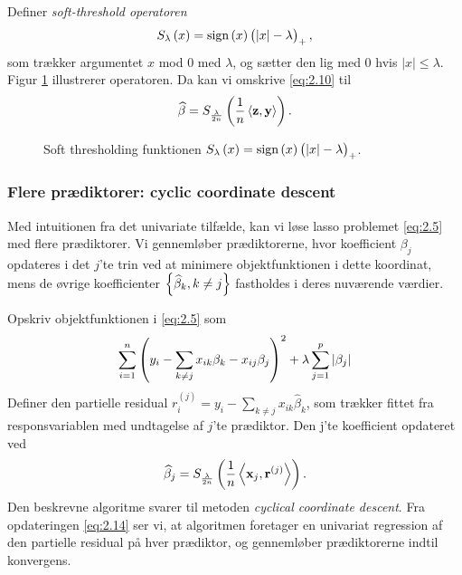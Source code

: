 Definer \textit{soft-threshold operatoren}
\begin{align*}
S_\lambda\del{x}=\text{sign}\del{x} \del{\vert x \vert - \lambda}_+,
\end{align*}
som trækker argumentet $x$ mod 0 med $\lambda$, og sætter den lig med 0 hvis $\vert x \vert \leq \lambda$. 
Figur \ref{fig:soft_thresholding_fct} illustrerer operatoren.
Da kan vi omskrive \eqref{eq:2.10} til
\begin{align*}
\widehat{\beta} = S_{\frac{\lambda}{2n}} \del{\frac{1}{n} \left\langle \mathbf{z}, \mathbf{y} \right\rangle}.
\end{align*}
%
\begin{figure}[H]
\centering
\scalebox{0.8}{}
\caption[optional short text]{Soft thresholding funktionen $S_\lambda\del{x}=\text{sign}\del{x} \del{\vert x \vert - \lambda}_+$.} \label{fig:soft_thresholding_fct}
\end{figure}
%
\subsubsection{Flere prædiktorer: cyclic coordinate descent}
Med intuitionen  fra det univariate tilfælde, kan vi løse lasso problemet \eqref{eq:2.5} med flere prædiktorer.
Vi gennemløber prædiktorerne, hvor koefficient \(\beta_j\) opdateres i det \(j\)'te trin ved at minimere objektfunktionen i dette koordinat, mens de øvrige koefficienter $\cbr{\widehat{\beta}_k, k \neq j}$ fastholdes i deres nuværende værdier. 


Opskriv objektfunktionen i \eqref{eq:2.5} som
\begin{align*}
\sum_{i=1}^n \del{y_i - \sum_{k \neq j} x_{ik} \beta_k - x_{ij} \beta_j}^2 + \lambda \sum_{j = 1}^p \vert \beta_j \vert
\end{align*}
Definer den partielle residual $r_i^{(j)}=y_i - \sum_{k \neq j} x_{ik} \widehat{\beta}_k$, som trækker fittet fra responsvariablen med undtagelse af \(j\)'te prædiktor.
Den j'te koefficient opdateret ved
\begin{align}
\widehat{\beta}_j = S_{\frac{\lambda}{2n}} \del{\frac{1}{n} \left\langle \mathbf{x}_j, \mathbf{r}^{(j)} \right\rangle}. \label{eq:2.14}
\end{align}
Den beskrevne algoritme svarer til metoden \textit{cyclical coordinate descent}.
Fra opdateringen \eqref{eq:2.14} ser vi, at algoritmen foretager en univariat regression af den partielle residual på hver prædiktor, og gennemløber prædiktorerne indtil konvergens.

